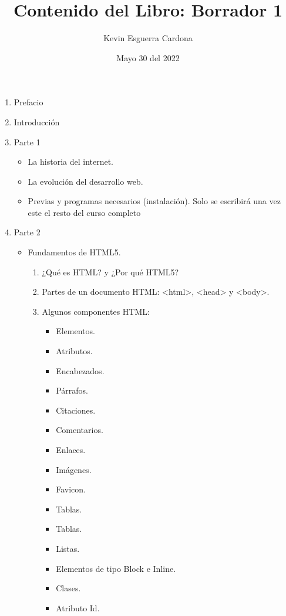 \documentclass[12pt, letterpaper]{article}
\title{Contenido del Libro: Borrador 1}
\author{Kevin  Esguerra Cardona}
\date{Mayo 30 del 2022}
\begin{document}
\maketitle

\begin{enumerate}
    \item Prefacio
    \item Introducción
    \item Parte 1
    \begin{itemize}
        \item La historia del internet.
        \item La evolución del desarrollo web.
        \item Previas y programas necesarios (instalación). \newline*Solo se escribirá  una vez este el resto del curso completo
    \end{itemize}
    \item Parte 2
    \begin{itemize}
        \item Fundamentos de HTML5.
        \begin{enumerate}
            \item ¿Qué es HTML? y ¿Por qué HTML5?
            \item Partes de un documento HTML: <html>, <head> y <body>.
            \item Algunos componentes HTML:
            \begin{itemize}
                \item Elementos.
                \item Atributos.
                \item Encabezados.
                \item Párrafos.
                \item Citaciones.
                \item Comentarios.
                \item Enlaces.
                \item Imágenes.
                \item Favicon.
                \item Tablas.
                \item Tablas.
                \item Listas.
                \item Elementos de tipo Block e Inline.
                \item Clases.
                \item Atributo Id.

\end{itemize}
\end{enumerate}
\end{itemize}
\end{enumerate}
\end{document}
